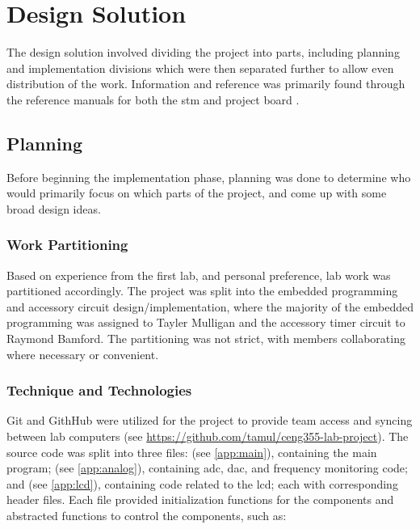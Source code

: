 
\section{Design Solution}
The design solution involved dividing the project into parts, including
planning and implementation divisions which were then separated further
to allow even distribution of the work. Information and reference was
primarily found through the reference manuals for both the \gls{stm} and
project board \cite{ref,board}.
\subsection{Planning}
Before beginning the implementation phase, planning was done to
determine who would primarily focus on which parts of the project, and
come up with some broad design ideas.
\subsubsection{Work Partitioning}
Based on experience from the first lab, and personal preference, lab
work was partitioned accordingly. The project was split into the
embedded programming and accessory circuit design/implementation, where
the majority of the embedded programming was assigned to Tayler Mulligan
and the accessory timer circuit to Raymond Bamford. The partitioning was
not strict, with members collaborating where necessary or convenient.

\subsubsection{Technique and Technologies}
Git and GithHub were utilized for the project to provide team access and
syncing between lab computers (see
\url{https://github.com/tamul/ceng355-lab-project}). The source code was
split into three files:  (see \ref{app:main}), containing the main program;
 (see \ref{app:analog}), containing \gls{adc},
\gls{dac}, and frequency monitoring
code; and  (see \ref{app:lcd}), containing code related
to the \gls{lcd}; each with corresponding header files. Each file
provided initialization functions for the components and abstracted
functions to control the components, such as:

